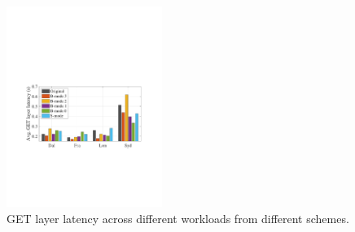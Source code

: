 %	

\begin{figure}[t]
	\centering
	\includegraphics[width=0.45\textwidth]{graphs/get-layer-latency.pdf}
	\caption{GET layer latency across different workloads from different schemes.}
	\label{fig:getlayerlatency}
	
\end{figure}

